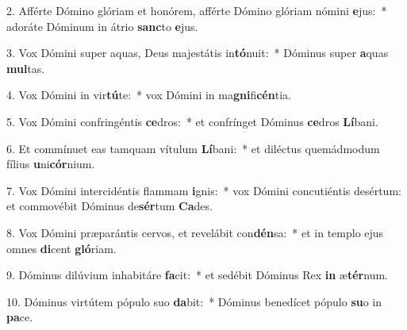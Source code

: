 2. Afférte Dómino glóriam et honórem, afférte Dómino glóriam nómini \textbf{e}jus:~*  adoráte Dóminum in átrio \textbf{sanc}to \textbf{e}jus.\

3. Vox Dómini super aquas, Deus majestátis in\textbf{tó}nuit:~*  Dóminus super \textbf{a}quas \textbf{mul}tas.\

4. Vox Dómini in vir\textbf{tú}te:~*  vox Dómini in ma\textbf{gni}fi\textbf{cén}tia.\

5. Vox Dómini confringéntis \textbf{ce}dros:~*  et confrínget Dóminus \textbf{ce}dros \textbf{Lí}bani.\

6. Et commínuet eas tamquam vítulum \textbf{Lí}bani:~*  et diléctus quemádmodum fílius \textbf{u}ni\textbf{cór}nium.\

7. Vox Dómini intercidéntis flammam \textbf{i}gnis:~*  vox Dómini concutiéntis desértum: et commovébit Dóminus de\textbf{sér}tum \textbf{Ca}des.\

8. Vox Dómini præparántis cervos, et revelábit con\textbf{dén}sa:~*  et in templo ejus omnes \textbf{di}cent \textbf{gló}riam.\

9. Dóminus dilúvium inhabitáre \textbf{fa}cit:~*  et sedébit Dóminus Rex \textbf{in} æ\textbf{tér}num.\

10. Dóminus virtútem pópulo suo \textbf{da}bit:~*  Dóminus benedícet pópulo \textbf{su}o in \textbf{pa}ce.\

